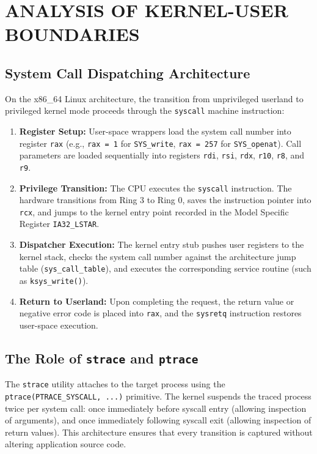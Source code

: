 \documentclass[12pt,a4paper]{report}
\numberwithin{equation}{chapter}
\numberwithin{figure}{chapter}
\numberwithin{table}{chapter}
\begin{document}
\chapter{ANALYSIS OF KERNEL-USER BOUNDARIES}

\section{System Call Dispatching Architecture}
On the x86\_64 Linux architecture, the transition from unprivileged userland to privileged kernel mode proceeds through the \texttt{syscall} machine instruction:
\begin{enumerate}
    \item \textbf{Register Setup:} User-space wrappers load the system call number into register \texttt{rax} (e.g., \texttt{rax = 1} for \texttt{SYS\_write}, \texttt{rax = 257} for \texttt{SYS\_openat}). Call parameters are loaded sequentially into registers \texttt{rdi}, \texttt{rsi}, \texttt{rdx}, \texttt{r10}, \texttt{r8}, and \texttt{r9}.
    \item \textbf{Privilege Transition:} The CPU executes the \texttt{syscall} instruction. The hardware transitions from Ring 3 to Ring 0, saves the instruction pointer into \texttt{rcx}, and jumps to the kernel entry point recorded in the Model Specific Register \texttt{IA32\_LSTAR}.
    \item \textbf{Dispatcher Execution:} The kernel entry stub pushes user registers to the kernel stack, checks the system call number against the architecture jump table (\texttt{sys\_call\_table}), and executes the corresponding service routine (such as \texttt{ksys\_write()}).
    \item \textbf{Return to Userland:} Upon completing the request, the return value or negative error code is placed into \texttt{rax}, and the \texttt{sysretq} instruction restores user-space execution.
\end{enumerate}

\section{The Role of \texttt{strace} and \texttt{ptrace}}
The \texttt{strace} utility attaches to the target process using the \texttt{ptrace(PTRACE\_SYSCALL, ...)} primitive. The kernel suspends the traced process twice per system call: once immediately before syscall entry (allowing inspection of arguments), and once immediately following syscall exit (allowing inspection of return values). This architecture ensures that every transition is captured without altering application source code.
\end{document}
